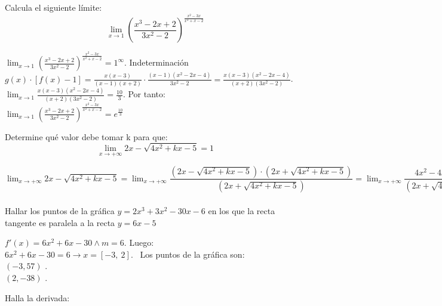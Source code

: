 \documentclass[addpoints,spanish, 12pt,a4paper]{exam}
\begin{document}
\begin{questions}


\question[6] Calcula el siguiente límite: $$\lim_{x \to 1} \left(\frac{x^{3} - 2 x + 2}{3 x^{2} - 2}\right)^{\frac{x^{2} - 3 x}{x^{2} + x - 2}}$$
\begin{solution}
$\lim_{x \to 1} \left(\frac{x^{3} - 2 x + 2}{3 x^{2} - 2}\right)^{\frac{x^{2} - 3 x}{x^{2} + x - 2}}=1^\infty$. Indeterminación \\ $g(x)\cdot\left[f(x)-1\right]=\frac{x \left(x - 3\right)}{\left(x - 1\right) \left(x + 2\right)}\cdot\frac{\left(x - 1\right) \left(x^{2} - 2 x - 4\right)}{3 x^{2} - 2}=\frac{x \left(x - 3\right) \left(x^{2} - 2 x - 4\right)}{\left(x + 2\right) \left(3 x^{2} - 2\right)}$. \\ $\lim_{x \to 1}\frac{x \left(x - 3\right) \left(x^{2} - 2 x - 4\right)}{\left(x + 2\right) \left(3 x^{2} - 2\right)}=\frac{10}{3}$. Por tanto: \\ $\lim_{x \to 1} \left(\frac{x^{3} - 2 x + 2}{3 x^{2} - 2}\right)^{\frac{x^{2} - 3 x}{x^{2} + x - 2}}=e^{\frac{10}{3}}$

\end{solution}
\addpoints

\question[6] Determine qué valor debe tomar k para que: $$\lim_{x \to +\infty}2x-\sqrt{4x^2+kx-5}=1$$
\begin{solution}
$\lim_{x \to +\infty}2x-\sqrt{4x^2+kx-5}=\lim_{x \to +\infty}\dfrac{(2x-\sqrt{4x^2+kx-5})\cdot(2x+\sqrt{4x^2+kx-5})}{(2x+\sqrt{4x^2+kx-5})}=\lim_{x \to +\infty}\dfrac{4x^2-4x^2-kx+5}{(2x+\sqrt{4x^2+kx-5})}=\lim_{x \to +\infty}\dfrac{-kx+5}{(2x+\sqrt{4x^2+kx-5})}=\lim_{x \to +\infty}\dfrac{-k+\frac{5}{x}}{(2+\sqrt{4+\frac{k}{x})-\frac{5}{x^2}}}=\dfrac{-k}{2+2} \to k = -4$
\end{solution}

\question[4] Hallar los puntos de la gráfica $y=2 x^{3} + 3 x^{2} - 30 x - 6$ en los que la recta tangente es paralela a la recta $y=6 x - 5$
\begin{solution}$f'(x)=6 x^{2} + 6 x - 30\land m=6$. Luego: \\ $6 x^{2} + 6 x - 30 = 6 \to x =\left[ -3, \  2\right] $. \ Los puntos de la gráfica son: \\   $\left(-3,57 \right)$ . \\  $\left(2,-38 \right)$ . \\ 
\end{solution}
\addpoints

\question Halla la derivada:


\end{questions}
\end{document}
